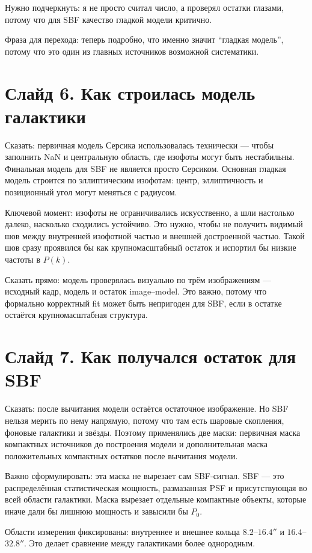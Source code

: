 \documentclass[12pt]{article}
\begin{document}
Нужно подчеркнуть: я не просто считал число, а проверял остатки глазами, потому что для SBF качество гладкой модели критично.

Фраза для перехода: теперь подробно, что именно значит ``гладкая модель'', потому что это один из главных источников возможной систематики.

\section*{Слайд 6. Как строилась модель галактики}

Сказать: первичная модель Серсика использовалась технически --- чтобы заполнить NaN и центральную область, где изофоты могут быть нестабильны. Финальная модель для SBF не является просто Серсиком. Основная гладкая модель строится по эллиптическим изофотам: центр, эллиптичность и позиционный угол могут меняться с радиусом.

Ключевой момент: изофоты не ограничивались искусственно, а шли настолько далеко, насколько сходились устойчиво. Это нужно, чтобы не получить видимый шов между внутренней изофотной частью и внешней достроенной частью. Такой шов сразу проявился бы как крупномасштабный остаток и испортил бы низкие частоты в $P(k)$.

Сказать прямо: модель проверялась визуально по трём изображениям --- исходный кадр, модель и остаток image--model. Это важно, потому что формально корректный fit может быть непригоден для SBF, если в остатке остаётся крупномасштабная структура.

\section*{Слайд 7. Как получался остаток для SBF}

Сказать: после вычитания модели остаётся остаточное изображение. Но SBF нельзя мерить по нему напрямую, потому что там есть шаровые скопления, фоновые галактики и звёзды. Поэтому применялись две маски: первичная маска компактных источников до построения модели и дополнительная маска положительных компактных остатков после вычитания модели.

Важно сформулировать: эта маска не вырезает сам SBF-сигнал. SBF --- это распределённая статистическая мощность, размазанная PSF и присутствующая во всей области галактики. Маска вырезает отдельные компактные объекты, которые иначе дали бы лишнюю мощность и завысили бы $P_0$.

Области измерения фиксированы: внутреннее и внешнее кольца $8.2$--$16.4''$ и $16.4$--$32.8''$. Это делает сравнение между галактиками более однородным.
\end{document}
